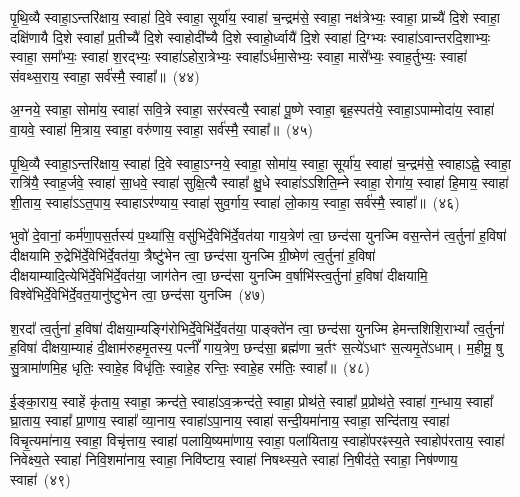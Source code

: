 {\anuvakamend[{}]}

पृ॒थि॒व्यै स्वाहा॒\-ऽन्तरि॑क्षाय॒ स्वाहा॑ दि॒वे स्वाहा॒ सूर्या॑य॒ स्वाहा॑ च॒न्द्रम॑से॒ स्वाहा॒ नक्ष॑त्रेभ्यः॒ स्वाहा॒ प्राच्यै॑ दि॒शे स्वाहा॒ दक्षि॑णायै दि॒शे स्वाहा᳚ प्र॒तीच्यै॑ दि॒शे स्वाहोदी᳚च्यै दि॒शे स्वाहो॒र्ध्वायै॑ दि॒शे स्वाहा॑ दि॒ग्भ्यः स्वाहा॑\-ऽ\-वान्तरदि॒शाभ्यः॒ स्वाहा॒ समा᳚भ्यः॒ स्वाहा॑ श॒रद्भ्यः॒ स्वाहा॑\-ऽहोरा॒त्रेभ्यः॒ स्वाहा᳚\-ऽर्धमा॒सेभ्यः॒ स्वाहा॒ मासे᳚भ्यः॒ स्वाह॒र्तुभ्यः॒ स्वाहा॑ संवथ्स॒राय॒ स्वाहा॒ सर्व॑स्मै॒ स्वाहा᳚॥~(४४)

{\anuvakamend[{}]}

अ॒ग्नये॒ स्वाहा॒ सोमा॑य॒ स्वाहा॑ सवि॒त्रे स्वाहा॒ सर॑स्वत्यै॒ स्वाहा॑ पू॒ष्णे स्वाहा॒ बृह॒स्पत॑ये॒ स्वाहा॒\-ऽपाम्मोदा॑य॒ स्वाहा॑ वा॒यवे॒ स्वाहा॑ मि॒त्राय॒ स्वाहा॒ वरु॑णाय॒ स्वाहा॒ सर्व॑स्मै॒ स्वाहा᳚॥~(४५)

{\anuvakamend[{}]}

पृ॒थि॒व्यै स्वाहा॒\-ऽन्तरि॑क्षाय॒ स्वाहा॑ दि॒वे स्वाहा॒\-ऽग्नये॒ स्वाहा॒ सोमा॑य॒ स्वाहा॒ सूर्या॑य॒ स्वाहा॑ च॒न्द्रम॑से॒ स्वाहा\-ऽह्ने॒ स्वाहा॒ रात्रि॑यै॒ स्वाह॒र्जवे॒ स्वाहा॑ सा॒धवे॒ स्वाहा॑ सुक्षि॒त्यै स्वाहा᳚ क्षु॒धे स्वाहा॑\-ऽ\-ऽशिति॒म्ने स्वाहा॒ रोगा॑य॒ स्वाहा॑ हि॒माय॒ स्वाहा॑ शी॒ताय॒ स्वाहा॑\-ऽ\-ऽत॒पाय॒ स्वाहा\-ऽर॑ण्याय॒ स्वाहा॑ सुव॒र्गाय॒ स्वाहा॑ लो॒काय॒ स्वाहा॒ सर्व॑स्मै॒ स्वाहा᳚॥~(४६)

{\anuvakamend[{}]}

भुवो॑ दे॒वानां॒ कर्म॑णा॒पस॒र्तस्य॑ प॒थ्या॑सि॒ वसु॑भिर्दे॒वेभि॑र्दे॒वत॑या गाय॒त्रेण॑ त्वा॒ छन्द॑सा युनज्मि वस॒न्तेन॑ त्व॒र्तुना॑ ह॒विषा॑ दीक्षयामि रु॒द्रेभि॑र्दे॒वेभि॑र्दे॒वत॑या॒ त्रैष्टु॑भेन त्वा॒ छन्द॑सा युनज्मि ग्री॒ष्मेण॑ त्व॒र्तुना॑ ह॒विषा॑ दीक्षयाम्यादि॒त्येभि॑\-र्दे॒वेभि॑र्दे॒वत॑या॒ जाग॑तेन त्वा॒ छन्द॑सा युनज्मि व॒र्\mbox{}षाभि॑स्त्व॒र्तुना॑ ह॒विषा॑ दीक्षयामि॒ विश्वे॑भिर्दे॒वेभि॑र्दे॒वत॒यानु॑ष्टुभेन त्वा॒ छन्द॑सा युनज्मि~(४७)

श॒रदा᳚ त्व॒र्तुना॑ ह॒विषा॑ दीक्षया॒म्यङ्गि॑रोभिर्दे॒वेभि॑र्दे॒वत॑या॒ पाङ्क्ते॑न त्वा॒ छन्द॑सा युनज्मि हेमन्तशिशि॒रा\-भ्यां᳚ त्व॒र्तुना॑ ह॒विषा॑ दीक्षया॒म्याहं दी॒क्षाम॑रुहमृ॒तस्य॒ पत्नीं᳚ गाय॒त्रेण॒ छन्द॑सा॒ ब्रह्म॑णा च॒र्तꣳ स॒त्ये॑\-ऽधाꣳ स॒त्यमृ॒ते॑\-ऽधाम्। म॒हीमू॒ षु सु॒त्रामा॑णमि॒ह धृतिः॒ स्वाहे॒ह विधृ॑तिः॒ स्वाहे॒ह रन्तिः॒ स्वाहे॒ह रम॑तिः॒ स्वाहा᳚॥~(४८)

{\anuvakamend[{}]}

ई॒ङ्का॒राय॒ स्वाहें कृ॑ताय॒ स्वाहा॒ क्रन्द॑ते॒ स्वाहा॑\-ऽव॒क्रन्द॑ते॒ स्वाहा॒ प्रोथ॑ते॒ स्वाहा᳚ प्र॒प्रोथ॑ते॒ स्वाहा॑ ग॒न्धाय॒ स्वाहा᳚ घ्रा॒ताय॒ स्वाहा᳚ प्रा॒णाय॒ स्वाहा᳚ व्या॒नाय॒ स्वाहा॑\-ऽपा॒नाय॒ स्वाहा॑ सन्दी॒यमा॑नाय॒ स्वाहा॒ सन्दि॑ताय॒ स्वाहा॑ विचृ॒त्यमा॑नाय॒ स्वाहा॒ विचृ॑त्ताय॒ स्वाहा॑ पलायि॒ष्यमा॑णाय॒ स्वाहा॒ पला॑यिताय॒ स्वाहो॑परꣴस्य॒ते स्वाहोप॑रताय॒ स्वाहा॑ निवेक्ष्य॒ते स्वाहा॑ निवि॒शमा॑नाय॒ स्वाहा॒ निवि॑ष्टाय॒ स्वाहा॑ निषथ्स्य॒ते स्वाहा॑ नि॒षीद॑ते॒ स्वाहा॒ निष॑ण्णाय॒ स्वाहा॑~(४९)




